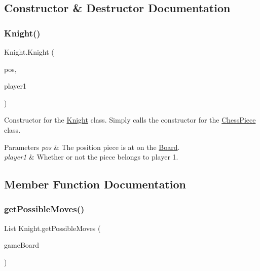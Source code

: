 \subsection{Constructor \& Destructor Documentation}
\mbox{\label{class_knight_aba6db24f094cf45339b4e52e36c43e9e}} 
\subsubsection{\texorpdfstring{Knight()}{Knight()}}
{\footnotesize\ttfamily Knight.\+Knight (\begin{DoxyParamCaption}\item[{@Not\+Null int \mbox{[}$\,$\mbox{]}}]{pos,  }\item[{boolean}]{player1 }\end{DoxyParamCaption})}

Constructor for the \mbox{\hyperlink{class_knight}{Knight}} class. Simply calls the constructor for the \mbox{\hyperlink{class_chess_piece}{Chess\+Piece}} class. 
\begin{DoxyParams}{Parameters}
{\em pos} & The position piece is at on the \mbox{\hyperlink{class_board}{Board}}. \\
\hline
{\em player1} & Whether or not the piece belongs to player 1. \\
\hline
\end{DoxyParams}


\subsection{Member Function Documentation}
\mbox{\label{class_knight_ad3e2ae082501548e6be42e083807769f}} 
\subsubsection{\texorpdfstring{get\+Possible\+Moves()}{getPossibleMoves()}}
{\footnotesize\ttfamily List Knight.\+get\+Possible\+Moves (\begin{DoxyParamCaption}\item[{@Not\+Null \mbox{\hyperlink{class_board}{Board}}}]{game\+Board }\end{DoxyParamCaption})}

